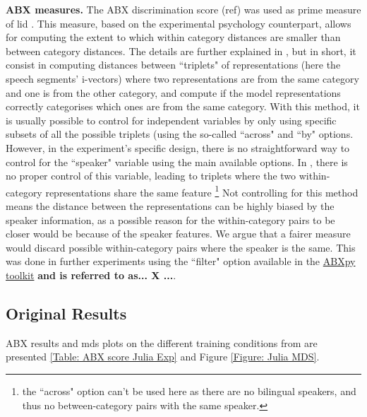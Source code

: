 \bigskip 

\par \noindent \textbf{ABX measures.} The ABX discrimination score (ref) was used as prime measure of \acrshort{lid} \citep{schatz2013evaluating}. This measure, based on the experimental psychology counterpart, allows for computing the extent to which within category distances are smaller than between category distances. The details are further explained in \citet{carbajal2016language}, but in short, it consist in computing distances between ``triplets" of representations (here the speech segments' i-vectors) where two representations are from the same category and one is from the other category, and compute if the model representations correctly categorises which ones are from the same category.  
With this method, it is usually possible to control for independent variables by only using specific subsets of all the possible triplets (using the so-called ``across" and ``by" options. However, in the experiment's specific design, there is no straightforward way to control for the ``speaker" variable using the main available options. In \citet{carbajal2016language}, there is no proper control of this variable, leading to triplets where the two within-category representations share the same feature \footnote{the ``across" option can't be used here as there are no bilingual speakers, and thus no between-category pairs with the same speaker.} Not controlling for this method means the distance between the representations can be highly biased by the speaker information, as a possible reason for the within-category pairs to be closer would be because of the speaker features. We argue that a fairer measure would discard possible within-category pairs where the speaker is the same. This was done in further experiments using the ``filter" option available in the \href{https://github.com/bootphon/ABXpy}{ABXpy toolkit} \textbf{and is referred to as... X ...}. 


\subsection{Original Results}

ABX results and \acrfull{mds} plots on the different training conditions from \citet{carbajal2016language} are presented \ref{Table: ABX score Julia Exp} and Figure \ref{Figure: Julia MDS}.


